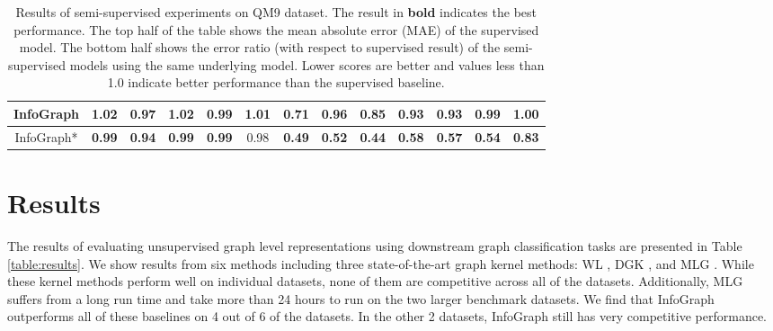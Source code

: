 \documentclass{article} \usepackage{iclr2020_conference,times}
\def\method{InfoGraph}
\begin{document}
\begin{table}[]
{\begin{tabular}{ccccccccccccc}
\multicolumn{1}{|c|}{\method{}}     & \multicolumn{1}{c|}{1.02}          & \multicolumn{1}{c|}{0.97}          & \multicolumn{1}{c|}{1.02}          & \multicolumn{1}{c|}{\textbf{0.99}} & \multicolumn{1}{c|}{1.01}          & \multicolumn{1}{c|}{0.71}          & \multicolumn{1}{c|}{0.96}          & \multicolumn{1}{c|}{0.85}          & \multicolumn{1}{c|}{0.93}          & \multicolumn{1}{c|}{0.93}          & \multicolumn{1}{c|}{0.99}          & \multicolumn{1}{c|}{1.00}          \\ \hline
\multicolumn{1}{|c|}{\method{}*}    & \multicolumn{1}{c|}{\textbf{0.99}} & \multicolumn{1}{c|}{\textbf{0.94}} & \multicolumn{1}{c|}{\textbf{0.99}} & \multicolumn{1}{c|}{\textbf{0.99}} & \multicolumn{1}{c|}{0.98}          & \multicolumn{1}{c|}{\textbf{0.49}}          & \multicolumn{1}{c|}{\textbf{0.52}}          & \multicolumn{1}{c|}{\textbf{0.44}} & \multicolumn{1}{c|}{\textbf{0.58}} & \multicolumn{1}{c|}{\textbf{0.57}}          & \multicolumn{1}{c|}{\textbf{0.54}} & \multicolumn{1}{c|}{\textbf{0.83}}          \\ \hline

\end{tabular}
}
\vspace{2mm}
	\caption{Results of semi-supervised experiments on QM9 dataset. The result in \textbf{bold} indicates the  best performance. The top half of the table shows the mean absolute error (MAE) of the supervised model. The bottom half shows the error ratio (with respect to supervised result) of the semi-supervised models using the same underlying model. Lower scores are better and values less than 1.0 indicate better performance than the supervised baseline.}
    \label{table:semi-results}
	
\end{table}
%
 
 
\section{Results}
The results of evaluating unsupervised graph level representations using downstream graph classification tasks are presented in Table \ref{table:results}. 
We show results from six methods including three state-of-the-art graph kernel methods: WL \cite{shervashidze2011weisfeiler}, DGK \cite{yanardag2015deep}, and MLG \cite{kondor2016multiscale}.
While these kernel methods perform well on individual datasets, none of them are competitive across all of the datasets. Additionally, MLG suffers from a long run time and take more than 24 hours to run on the two larger benchmark datasets. 
We find that \method{} outperforms all of these baselines on 4 out of 6 of the datasets. In the other 2 datasets, \method{} still has very competitive performance. 
\end{document}
